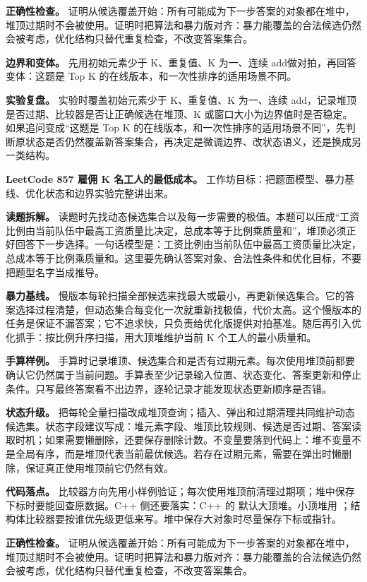 \textbf{正确性检查。} 证明从候选覆盖开始：所有可能成为下一步答案的对象都在堆中，堆顶过期时不会被使用。证明时把算法和暴力版对齐：暴力能覆盖的合法候选仍然会被考虑，优化结构只替代重复检查，不改变答案集合。

\textbf{边界和变体。} 先用初始元素少于 K、重复值、K 为一、连续 add做对拍，再回答变体：这题是 Top K 的在线版本，和一次性排序的适用场景不同。

\textbf{实验复盘。} 实验时覆盖初始元素少于 K、重复值、K 为一、连续 add，记录堆顶是否过期、比较器是否让正确候选在堆顶、K 或窗口大小为边界值时是否稳定。如果追问变成“这题是 Top K 的在线版本，和一次性排序的适用场景不同”，先判断原状态是否仍然覆盖新答案集合，再决定是微调边界、改状态语义，还是换成另一类结构。

\noindent\textbf{LeetCode 857 雇佣 K 名工人的最低成本。} 工作坊目标：把题面模型、暴力基线、优化状态和边界实验完整讲出来。

\textbf{读题拆解。} 读题时先找动态候选集合以及每一步需要的极值。本题可以压成“工资比例由当前队伍中最高工资质量比决定，总成本等于比例乘质量和”，堆顶必须正好回答下一步选择。一句话模型是：工资比例由当前队伍中最高工资质量比决定，总成本等于比例乘质量和。这里要先确认答案对象、合法性条件和优化目标，不要把题型名字当成推导。

\textbf{暴力基线。} 慢版本每轮扫描全部候选来找最大或最小，再更新候选集合。它的答案选择过程清楚，但动态集合每变化一次就重新找极值，代价太高。这个慢版本的任务是保证不漏答案；它不追求快，只负责给优化版提供对拍基准。随后再引入优化抓手：按比例升序扫描，用大顶堆维护当前 K 个工人的最小质量和。

\textbf{手算样例。} 手算时记录堆顶、候选集合和是否有过期元素。每次使用堆顶前都要确认它仍然属于当前问题。手算表至少记录输入位置、状态变化、答案更新和停止条件。只写最终答案看不出边界，逐轮记录才能发现状态更新顺序是否错。

\textbf{状态升级。} 把每轮全量扫描改成堆顶查询；插入、弹出和过期清理共同维护动态候选集。状态字段建议写成：堆元素字段、堆顶比较规则、候选是否过期、答案读取时机；如果需要懒删除，还要保存删除计数。不变量要落到代码上：堆不变量不是全局有序，而是堆顶代表当前最优候选。若存在过期元素，需要在弹出时懒删除，保证真正使用堆顶前它仍然有效。

\textbf{代码落点。} 比较器方向先用小样例验证；每次使用堆顶前清理过期项；堆中保存下标时要能回查原数据。C++ 侧还要落实：C++ 的  默认大顶堆。小顶堆用 ；结构体比较器要按谁优先级更低来写。堆中保存大对象时尽量保存下标或指针。

\textbf{正确性检查。} 证明从候选覆盖开始：所有可能成为下一步答案的对象都在堆中，堆顶过期时不会被使用。证明时把算法和暴力版对齐：暴力能覆盖的合法候选仍然会被考虑，优化结构只替代重复检查，不改变答案集合。

